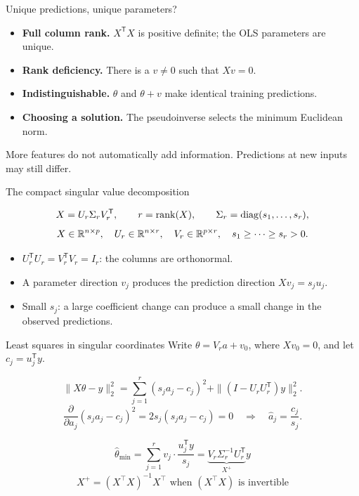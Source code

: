 

\begin{frame}{Unique predictions, unique parameters?}
\small
\begin{itemize}\setlength{\itemsep}{10pt}
\item \textbf{Full column rank.} $X^{\mathsf T}X$ is positive definite; the OLS parameters are unique.
\item \textbf{Rank deficiency.} There is a $v\ne0$ such that $Xv=0$.
\item \textbf{Indistinguishable.} $\theta$ and $\theta+v$ make identical training predictions.
\item \textbf{Choosing a solution.} The pseudoinverse selects the minimum Euclidean norm.
\end{itemize}
\vfill
\begin{takeaway}More features do not automatically add information. Predictions at new inputs may still differ.\end{takeaway}
\end{frame}

\begin{frame}{The compact singular value decomposition}
\begin{definitionbox}
\[
 X=U_r\Sigma_r V_r^{\mathsf T},\qquad r=\operatorname{rank}(X),
 \qquad \Sigma_r=\operatorname{diag}(s_1,\ldots,s_r),
\]
\[
 X\in\mathbb{R}^{n\times p},\quad U_r\in\mathbb{R}^{n\times r},\quad
 V_r\in\mathbb{R}^{p\times r},\quad s_1\geq\cdots\geq s_r>0.
\]
\end{definitionbox}
\small
\begin{itemize}\setlength{\itemsep}{7pt}
\item $U_r^{\mathsf T}U_r=V_r^{\mathsf T}V_r=I_r$: the columns are orthonormal.
\item A parameter direction $v_j$ produces the prediction direction
      $Xv_j=s_j u_j$.
\item Small $s_j$: a large coefficient change can produce a small change in the observed predictions.
\end{itemize}
\end{frame}

\begin{frame}{Least squares in singular coordinates}
\small
Write $\theta=V_r a+v_0$, where $Xv_0=0$, and let $c_j=u_j^{\mathsf T}y$.
\begin{definitionbox}
\[
 \|X\theta-y\|_2^2
 =\sum_{j=1}^r(s_j a_j-c_j)^2
   +\|(I-U_rU_r^{\mathsf T})y\|_2^2.
\]
\[
 \frac{\partial}{\partial a_j}(s_j a_j-c_j)^2
 =2s_j(s_j a_j-c_j)=0
 \quad\Longrightarrow\quad \widehat a_j=\frac{c_j}{s_j}.
\]
\end{definitionbox}
\[
 \widehat\theta_{\min}=\sum_{j=1}^r v_j \cdot\frac{u_j^{\mathsf T}y}{s_j} =\underbrace{V_r\Sigma_r^{-1}U_r^{\mathsf T}}_{X^+}y 
\]
\[ X^+ = (X^{\top}X)^{-1}X^{\top} \text{ when } (X^{\top}X) \text{ is invertible}
\]
\end{frame}

